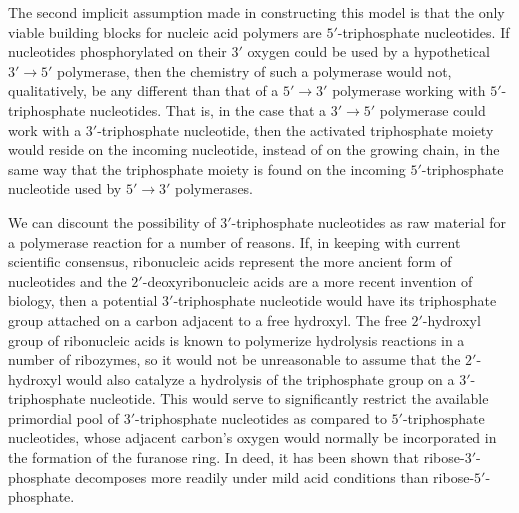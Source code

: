 The second implicit assumption made in constructing this model is that the only viable building blocks for nucleic acid polymers are $5'$-triphosphate nucleotides. If nucleotides phosphorylated on their $3'$ oxygen could be used by a hypothetical $3'\to5'$ polymerase, then the chemistry of such a polymerase would not, qualitatively, be any different than that of a $5'\to3'$ polymerase working with $5'$-triphosphate nucleotides. That is, in the case that a $3'\to5'$ polymerase could work with a $3'$-triphosphate nucleotide, then the activated triphosphate moiety would reside on the incoming nucleotide, instead of on the growing chain, in the same way that the triphosphate moiety is found on the incoming $5'$-triphosphate nucleotide used by $5'\to3'$ polymerases.

We can discount the possibility of $3'$-triphosphate nucleotides as raw material for a polymerase reaction for a number of reasons. If, in keeping with current scientific consensus, ribonucleic acids represent the more ancient form of nucleotides and the $2'$-deoxyribonucleic acids are a more recent invention of biology, then a potential $3'$-triphosphate nucleotide would have its triphosphate group attached on a carbon adjacent to a free hydroxyl. The free $2'$-hydroxyl group of ribonucleic acids is known to polymerize hydrolysis reactions in a number of ribozymes, so it would not be unreasonable to assume that the $2'$-hydroxyl would also catalyze a hydrolysis of the triphosphate group on a $3'$-triphosphate nucleotide. This would serve to significantly restrict the available primordial pool of $3'$-triphosphate nucleotides as compared to $5'$-triphosphate nucleotides, whose adjacent carbon's oxygen would normally be incorporated in the formation of the furanose ring. In deed, it has been shown that ribose-$3'$-phosphate decomposes more readily under mild acid conditions than ribose-$5'$-phosphate.

